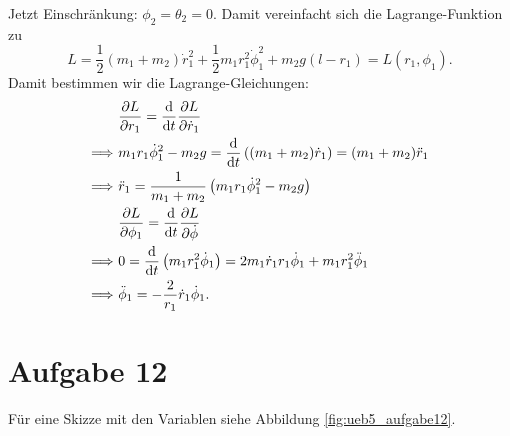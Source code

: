 Jetzt Einschränkung: $\phi_2 = \theta_2 = 0$. Damit vereinfacht sich die Lagrange-Funktion zu 
\[
	L = \frac{1}{2} (m_1 + m_2) \dot{r}_1^2 + \frac{1}{2} m_1 r_1^2 \dot{\phi}_1^2 + m_2 g (l - r_1) = L(r_1, \phi_1)
	\text{.}
\]	
Damit bestimmen wir die Lagrange-Gleichungen:
\begin{align*}
	& \frac{\partial L}{\partial r_1} = \frac{\mathrm{d}}{\mathrm{d}t} \frac{\partial L}{\partial \dot{r}_1} \\
	\Longrightarrow~ & m_1 r_1 \dot{\phi}_1^2 - m_2 g = \frac{\mathrm{d}}{\mathrm{d}t} \left( (m_1 + m_2) \dot{r}_1 \right) = (m_1 + m_2) \ddot{r}_1 \\
	\Longrightarrow~ & \ddot{r}_1 = \frac{1}{m_1 + m_2} \left( m_1 r_1 \dot{\phi}_1^2 - m_2 g \right) \\
	& \frac{\partial L}{\partial \phi_1} = \frac{\mathrm{d}}{\mathrm{d}t} \frac{\partial L}{\partial \dot{\phi}} \\
	\Longrightarrow~ & 0 = \frac{\mathrm{d}}{\mathrm{d}t} \left( m_1 r_1^2 \dot{\phi}_1 \right) = 2 m_1 \dot{r}_1 r_1 \dot{\phi}_1 + m_1 r_1^2 \ddot{\phi}_1 \\
	\Longrightarrow~ & \ddot{\phi}_1 = - \frac{2}{r_1} \dot{r}_1 \dot{\phi}_1
	\text{.}
\end{align*}

\section*{Aufgabe 12}

Für eine Skizze mit den Variablen siehe Abbildung \ref{fig:ueb5_aufgabe12}.

